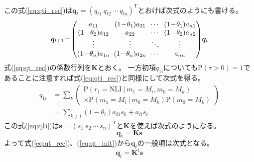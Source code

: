 \documentclass{jarticle}
\numberwithin{equation}{section}
\numberwithin{table}{section}
\numberwithin{figure}{section}
\theoremstyle{plain}
\begin{document}
この式(\ref{eq:qti_rec})は$ \bm{q}_t = (q_{t 1}\ q_{t 2}\ \cdots\ q_{t n})^\mathrm{T} $とおけば次式のようにも書ける。
\begin{equation}
    \arraycolsep3pt
    \bm{q}_{t + 1} \! = \!
    \begin{pmatrix}
        a_{1 1} & (1 \! - \! \theta_1) a_{2 1} & \cdots & (1 \! - \! \theta_1) a_{n 1} \\
        (1 \! - \! \theta_2) a_{1 2} & a_{2 2} & \cdots & (1 \! - \! \theta_2) a_{n 2} \\
        \vdots & \vdots & \ddots & \vdots \\
        (1 \! - \! \theta_n) a_{1 n} & (1 \! - \! \theta_n) a_{2 n} & \cdots & a_{n n} \\
    \end{pmatrix}
    \! \bm{q}_t
    \label{eq:qt_rec}
\end{equation}
式(\ref{eq:qt_rec})の係数行列を$ \bm{K} $とおく。
一方初項$ q_{1 i} $についても$ \mathrm{P}(\tau > 0) = 1 $であることに注意すれば式(\ref{eq:qti_rec})と同様にして次式を得る。
\begin{align}
    q_{1 i} & = \! \sum_{k} \left(
        \begin{array}{l}
            \mathrm{P}(r_1 = \mathrm{NLI}\ |\ m_1 = M_i , m_0 = M_k) \\
            \times \mathrm{P}(m_1 = M_i\ |\ m_0 = M_k) \mathrm{P}(m_0 = M_k)
        \end{array}
    \right) \nonumber\\
    & = \! \sum_{k \ne i} (1 - \theta_i) a_{k i} s_k + a_{i i} s_i
    \label{eq:q1i}
\end{align}
この式(\ref{eq:q1i})は$ \bm{s} = (s_1\ s_2\ \cdots\ s_n)^\mathrm{T} $と$ \bm{K} $を使えば次式のようになる。
\begin{equation} \label{eq:qt_init}
    \bm{q}_1 = \bm{K} \bm{s}
\end{equation}
よって式(\ref{eq:qt_rec})、(\ref{eq:qt_init})から$ \bm{q}_t $の一般項は次式となる。
\begin{equation} \label{eq:qt}
    \bm{q}_t = \bm{K}^t \bm{s}
\end{equation}
\end{document}
